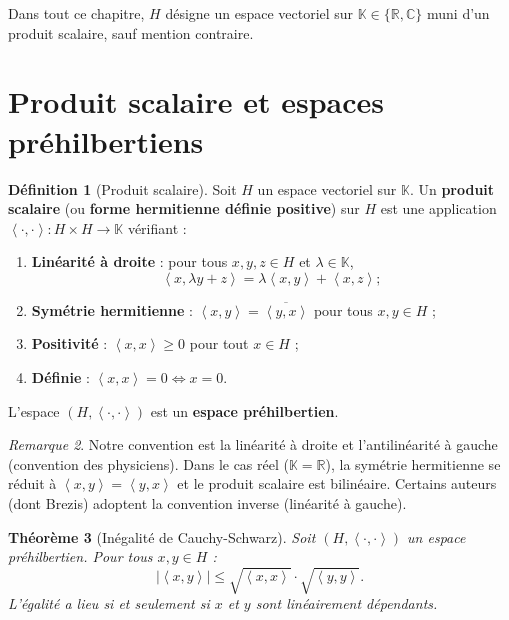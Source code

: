 \documentclass[a4paper,12pt]{book}
\newcommand{\R}{\mathbb{R}}
\newcommand{\C}{\mathbb{C}}
\newcommand{\K}{\mathbb{K}}
\newcommand{\abs}[1]{\left| #1 \right|}
\newcommand{\inner}[2]{\left\langle #1, #2 \right\rangle}
\theoremstyle{definition}
\newtheorem{definition}{Définition}[chapter]
\theoremstyle{plain}
\newtheorem{theoreme}[definition]{Théorème}
\theoremstyle{remark}
\newtheorem{remarque}[definition]{Remarque}
\begin{document}
Dans tout ce chapitre, $H$ désigne un espace vectoriel sur $\K \in \{\R, \C\}$ muni d'un produit scalaire, sauf mention contraire.

\section{Produit scalaire et espaces préhilbertiens}

\begin{definition}[Produit scalaire]\label{def:produit-scalaire}
Soit $H$ un espace vectoriel sur $\K$. Un \textbf{produit scalaire} (ou \textbf{forme hermitienne définie positive}) sur $H$ est une application $\inner{\cdot}{\cdot} : H \times H \to \K$ vérifiant :
\begin{enumerate}[label=(\roman*)]
    \item \textbf{Linéarité à droite} : pour tous $x, y, z \in H$ et $\lambda \in \K$,
    \[
        \inner{x}{\lambda y + z} = \lambda \inner{x}{y} + \inner{x}{z} ;
    \]
    \item \textbf{Symétrie hermitienne} : $\inner{x}{y} = \overline{\inner{y}{x}}$ pour tous $x, y \in H$ ;
    \item \textbf{Positivité} : $\inner{x}{x} \geq 0$ pour tout $x \in H$ ;
    \item \textbf{Définie} : $\inner{x}{x} = 0 \iff x = 0$.
\end{enumerate}
L'espace $(H, \inner{\cdot}{\cdot})$ est un \textbf{espace préhilbertien}.
\end{definition}

\begin{remarque}\label{rem:convention-lineaire}
Notre convention est la linéarité à droite et l'antilinéarité à gauche (convention des physiciens). Dans le cas réel ($\K = \R$), la symétrie hermitienne se réduit à $\inner{x}{y} = \inner{y}{x}$ et le produit scalaire est bilinéaire. Certains auteurs (dont Brezis) adoptent la convention inverse (linéarité à gauche).
\end{remarque}

\begin{theoreme}[Inégalité de Cauchy-Schwarz]\label{thm:cauchy-schwarz}
Soit $(H, \inner{\cdot}{\cdot})$ un espace préhilbertien. Pour tous $x, y \in H$ :
\[
    \abs{\inner{x}{y}} \leq \sqrt{\inner{x}{x}} \cdot \sqrt{\inner{y}{y}}.
\]
L'égalité a lieu si et seulement si $x$ et $y$ sont linéairement dépendants.
\end{theoreme}
\end{document}
